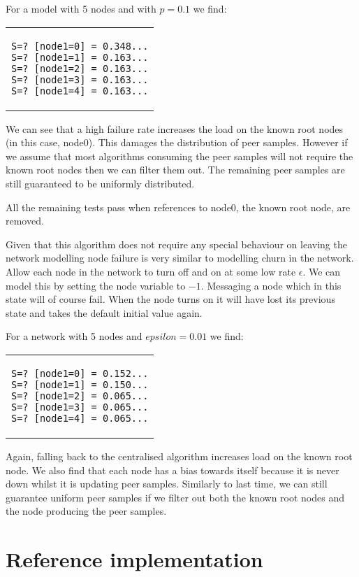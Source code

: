 \documentclass[a4paper,10pt]{article}
\newcommand{\prismmodel}[1]{
  \begin{quotation}
  \footnotesize
  
  \end{quotation}
}
\newenvironment{prismprop}[0]{
  \begin{center}
  \begin{tabular}{c}
  \footnotesize
}{
  \end{tabular}
  \end{center}
}
\begin{document}
\prismmodel{ctmc_full_error}

For a model with 5 nodes and with $p=0.1$ we find:

\begin{prismprop}
\begin{lstlisting}
S=? [node1=0] = 0.348...
S=? [node1=1] = 0.163...
S=? [node1=2] = 0.163...
S=? [node1=3] = 0.163...
S=? [node1=4] = 0.163...
\end{lstlisting}
\end{prismprop}

We can see that a high failure rate increases the load on the known root nodes (in this case, node0). This damages the distribution of peer samples. However if we assume that most algorithms consuming the peer samples will not require the known root nodes then we can filter them out. The remaining peer samples are still guaranteed to be uniformly distributed.

All the remaining tests pass when references to node0, the known root node, are removed.

Given that this algorithm does not require any special behaviour on leaving the network modelling node failure is very similar to modelling churn in the network. Allow each node in the network to turn off and on at some low rate $\epsilon$. We can model this by setting the node variable to $-1$. Messaging a node which in this state will of course fail. When the node turns on it will have lost its previous state and takes the default initial value again.

\prismmodel{ctmc_full_churn}

For a network with 5 nodes and $epsilon=0.01$ we find:

\begin{prismprop}
\begin{lstlisting}
S=? [node1=0] = 0.152...
S=? [node1=1] = 0.150...
S=? [node1=2] = 0.065...
S=? [node1=3] = 0.065...
S=? [node1=4] = 0.065...
\end{lstlisting}
\end{prismprop}

Again, falling back to the centralised algorithm increases load on the known root node. We also find that each node has a bias towards itself because it is never down whilst it is updating peer samples. Similarly to last time, we can still guarantee uniform peer samples if we filter out both the known root nodes and the node producing the peer samples.

\section{Reference implementation}
\end{document}
